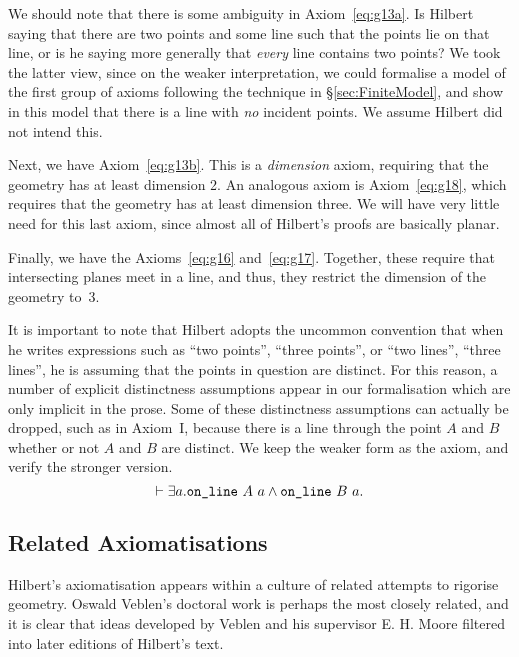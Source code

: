 \label{sec:DanglingPoints}
We should note that there is some ambiguity in Axiom~\ref{eq:g13a}. Is Hilbert saying that there are two points and some line such that the points lie on that line, or is he saying more generally that \emph{every} line contains two points? We took the latter view, since on the weaker interpretation, we could formalise a model of the first group of axioms following the technique in \S\ref{sec:FiniteModel}, and show in this model that there is a line with \emph{no} incident points. We assume Hilbert did not intend this.

Next, we have Axiom~\ref{eq:g13b}. This is a \emph{dimension} axiom, requiring that the geometry has at least dimension 2. An analogous axiom is Axiom~\ref{eq:g18}, which requires that the geometry has at least dimension three. We will have very little need for this last axiom, since almost all of Hilbert's proofs are basically planar.

Finally, we have the Axioms~\ref{eq:g16} and~\ref{eq:g17}. Together, these require that intersecting planes meet in a line, and thus, they restrict the dimension of the geometry to~3.

It is important to note that Hilbert adopts the uncommon convention that when he writes expressions such as ``two points'', ``three points'', or ``two lines'', ``three lines'', he is assuming that the points in question are distinct\label{sec:DistinctVars}. For this reason, a number of explicit distinctness assumptions appear in our formalisation which are only implicit in the prose. Some of these distinctness assumptions can actually be dropped, such as in Axiom~I, because there is a line through the point $A$ and $B$ whether or not $A$ and $B$ are distinct. We keep the weaker form as the axiom, and verify the stronger version.
\begin{displaymath}
  \vdash \exists a. \texttt{on\_line}\ A\ a \wedge \texttt{on\_line}\ B\ a.
\end{displaymath}

\subsection{Related Axiomatisations}
Hilbert's axiomatisation appears within a culture of related attempts to rigorise geometry. Oswald Veblen's doctoral work \cite{Veblenphd} is perhaps the most closely related, and it is clear that ideas developed by Veblen and his supervisor E. H. Moore filtered into later editions of Hilbert's text.


